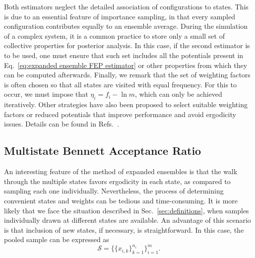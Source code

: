 \documentclass[aip,jcp,preprint,amsmath,amssymb]{revtex4-1}
\begin{document}
Both estimators neglect the detailed association of configurations to states. This is due to an essential feature of importance sampling, in that every sampled configuration contributes equally to an ensemble average. During the simulation of a complex system, it is a common practice to store only a small set of collective properties for posterior analysis. In this case, if the second estimator is to be used, one must ensure that such set includes all the potentials present in Eq.~\eqref{eq:expanded ensemble FEP estimator} or other properties from which they can be computed afterwards. Finally, we remark that the set of weighting factors is often chosen so that all states are visited with equal frequency. For this to occur, we must impose that $\eta_i = f_i - \ln m$, which can only be achieved iteratively. Other strategies have also been proposed to select suitable weighting factors or reduced potentials that improve performance and avoid ergodicity issues. Details can be found in Refs.~.

\subsection{Multistate Bennett Acceptance Ratio}

An interesting feature of the method of expanded ensembles is that the walk through the multiple states favors ergodicity in each state, as compared to sampling each one individually. Nevertheless, the process of determining convenient states and weights can be tedious and time-consuming. It is more likely that we face the situation described in Sec.~\ref{sec:definitions}, when samples individually drawn at different states are available. An advantage of this scenario is that inclusion of new states, if necessary, is straightforward. In this case, the pooled sample can be expressed as
\begin{equation}
\label{eq:pooled sample}
\mathcal S = \Big\{\{x_{i,k}\}_{k=1}^{n_i}\Big\}_{i=1}^m.
\end{equation}
\end{document}
